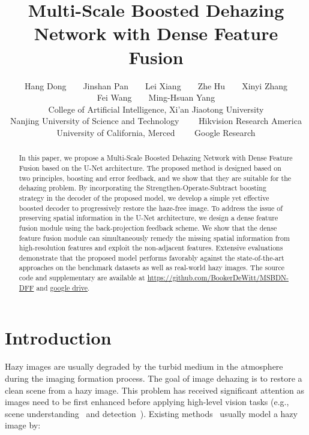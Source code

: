 \documentclass[10pt,twocolumn,letterpaper]{article}
\begin{document}
\title{Multi-Scale Boosted Dehazing Network with Dense Feature Fusion}

\author{Hang Dong~~~~Jinshan Pan~~~~Lei Xiang~~~~Zhe Hu~~~~Xinyi Zhang
\\ Fei Wang~~~~Ming-Hsuan Yang
\\
 College of Artificial Intelligence, Xi’an Jiaotong University
\\ Nanjing University of Science and Technology~~~~ Hikvision Research America
\\ University of California, Merced~~~~ Google Research
\\
}

\maketitle
\thispagestyle{empty}
\linespread{0.98} 

\begin{abstract}
In this paper, we propose a Multi-Scale Boosted Dehazing Network with Dense Feature Fusion based on the U-Net architecture.
The proposed method is designed based on two principles, boosting and error feedback, and we show that they are suitable for the dehazing problem.
By incorporating the Strengthen-Operate-Subtract boosting strategy in the decoder of the proposed model, we develop a simple yet effective boosted decoder to progressively restore the haze-free image.
To address the issue of preserving spatial information in the U-Net architecture, we design a dense feature fusion module using the back-projection feedback scheme.
We show that the dense feature fusion module can simultaneously remedy the missing spatial information from high-resolution features and exploit the non-adjacent features.
Extensive evaluations demonstrate that the proposed model performs favorably against the state-of-the-art approaches on the benchmark datasets as well as real-world hazy images.
The source code and supplementary are available at \href{https://github.com/BookerDeWitt/MSBDN-DFF}{https://github.com/BookerDeWitt/MSBDN-DFF} 
    and \href{https://drive.google.com/file/d/1pAuhHFOV6wV1xNJ6ZAMyLZ_APaRkp45O/view?usp=sharing}{google drive}.
  \end{abstract}
  
  
  
\vspace{-3mm}
  \section{Introduction}
  \label{sec:intro}
  \vspace{-1mm}
  Hazy images are usually degraded by the turbid medium in the atmosphere during the imaging formation process.
The goal of image dehazing is to restore a clean scene from a hazy image.
This problem has received significant attention as images need to be first enhanced before applying
  high-level vision tasks (e.g., scene understanding~\cite{dehazing_app1} and detection~\cite{dehazing_app2}).
Existing methods~\cite{deep_physical1, MSCNN, DCPDN, AOD, PDN} usually model a hazy image  by:
\end{document}
